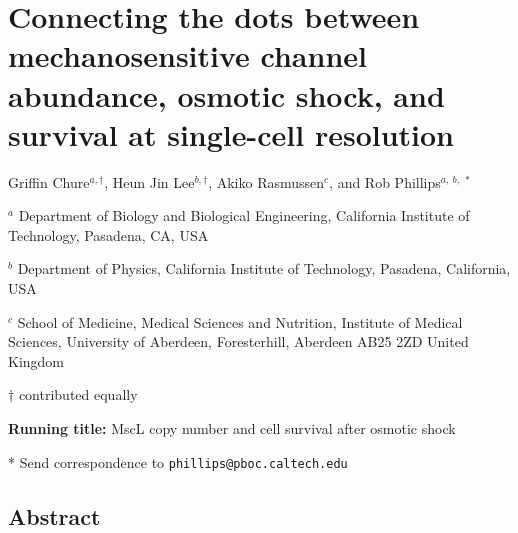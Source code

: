 \newcommand{\plusnamesingular}{}
\newcommand{\starnamesingular}{}
\newcommand{\xrefname}[1]{\protect\renewcommand{\plusnamesingular}{#1}}
\newcommand{\Xrefname}[1]{\protect\renewcommand{\starnamesingular}{#1}}
\providecommand{\cref}{\plusnamesingular~\ref}
\providecommand{\Cref}{\starnamesingular~\ref}
\providecommand{\crefformat}[2]{}
\providecommand{\Crefformat}[2]{}

\crefformat{equation}{Eq.~#2#1#3}
\Crefformat{equation}{Equation~#2#1#3}

\section{Connecting
the
dots
between
mechanosensitive
channel
abundance,
osmotic
shock,
and
survival
at
single-cell
resolution}\label{connecting-the-dots-between-mechanosensitive-channel-abundance-osmotic-shock-and-survival-at-single-cell-resolution}

Griffin
Chure\(^{a, \dagger}\),
Heun
Jin
Lee\(^{b, \dagger}\),
Akiko
Rasmussen\(^c\),
and
Rob
Phillips\(^{a,\ b,\ *}\)

\(^a\)
Department
of
Biology
and
Biological
Engineering,
California
Institute
of
Technology,
Pasadena,
CA,
USA

\(^b\)
Department
of
Physics,
California
Institute
of
Technology,
Pasadena,
California,
USA

\(^c\)
School
of
Medicine,
Medical
Sciences
and
Nutrition,
Institute
of
Medical
Sciences,
University
of
Aberdeen,
Foresterhill,
Aberdeen
AB25
2ZD
United
Kingdom

\(\dagger\)
contributed
equally

\textbf{Running
title:}
MscL
copy
number
and
cell
survival
after
osmotic
shock

* Send
correspondence
to
\texttt{phillips@pboc.caltech.edu}

\subsection{Abstract}\label{abstract}

